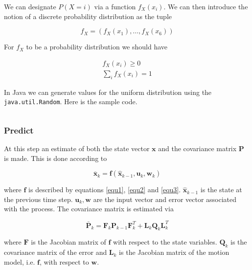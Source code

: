 We can designate $P(X = i)$ via a function $f_X (x_i)$. We can then introduce the notion of a discrete probability distribution as the tuple

\begin{equation} 
f_X = (f_X(x_1),\dots, f_X(x_6))  
\end{equation}

For $f_X$ to be a probability distribution we should have

\begin{eqnarray}
f_X(x_i) \ge 0 \\
\sum_{i} f_X(x_i) = 1 
\end{eqnarray} 


\begin{framed}
\begin{example}

In Java we can generate values for the uniform distribution using the \texttt{java.util.Random}.
Here is the sample code.

\begin{verbatim}
\end{verbatim}

\end{example}
\end{framed}


\subsubsection{Predict}

At this step an estimate of both the state vector $\mathbf{x}$ and the covariance matrix $\mathbf{P}$ is made.
This is done according to

\begin{equation}
\bar{\mathbf{x}}_k = \mathbf{f}(\hat{\mathbf{x}}_{k-1}, \mathbf{u}_k, \mathbf{w}_k)
\end{equation}

where $\mathbf{f}$ is described by equations \ref{equ1},  \ref{equ2} and \ref{equ3}. $\hat{\mathbf{x}}_{k-1}$ is the state at the previous
time step. $\mathbf{u}_k, \mathbf{w}$ are the input vector and error vector associated with the process. The covariance matrix is estimated via 

\begin{equation}
\bar{\mathbf{P}}_k = \mathbf{F}_k \mathbf{P}_{k-1} \mathbf{F}_{k}^T + \mathbf{L}_k\mathbf{Q}_k\mathbf{L}_{k}^T
\end{equation}

where $\mathbf{F}$ is the Jacobian matrix of $\mathbf{f}$ with respect to the state variables. 
$\mathbf{Q}_k$ is the covariance matrix of the error and $\mathbf{L}_k$ is the Jacobian matrix of the motion
model, i.e. $\mathbf{f}$, with respect to $\mathbf{w}$.

